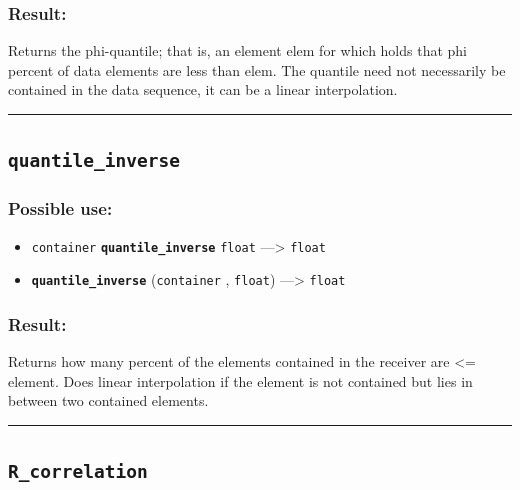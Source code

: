 \documentclass[]{book}
\providecommand{\tightlist}{%
  \setlength{\itemsep}{0pt}\setlength{\parskip}{0pt}}
\theoremstyle{definition}
\theoremstyle{definition}
\theoremstyle{definition}
\theoremstyle{remark}
\begin{document}
\subsubsection{Result:}\label{result-410}

Returns the phi-quantile; that is, an element elem for which holds that
phi percent of data elements are less than elem. The quantile need not
necessarily be contained in the data sequence, it can be a linear
interpolation.

\begin{center}\rule{0.5\linewidth}{\linethickness}\end{center}

\subsection{\texorpdfstring{\texttt{quantile\_inverse}}{quantile\_inverse}}\label{quantile_inverse}

\subsubsection{Possible use:}\label{possible-use-425}

\begin{itemize}
\tightlist
\item
  \texttt{container} \textbf{\texttt{quantile\_inverse}} \texttt{float}
  ---\textgreater{} \texttt{float}
\item
  \textbf{\texttt{quantile\_inverse}} (\texttt{container} ,
  \texttt{float}) ---\textgreater{} \texttt{float}
\end{itemize}

\subsubsection{Result:}\label{result-411}

Returns how many percent of the elements contained in the receiver are
\textless{}= element. Does linear interpolation if the element is not
contained but lies in between two contained elements.

\begin{center}\rule{0.5\linewidth}{\linethickness}\end{center}

\subsection{\texorpdfstring{\texttt{R\_correlation}}{R\_correlation}}\label{r_correlation}
\end{document}
